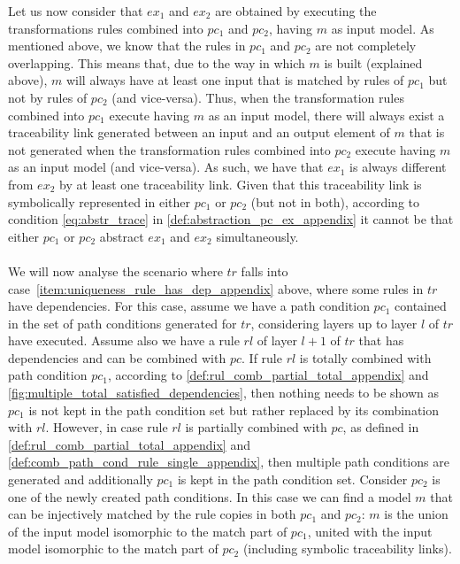 \begin{pf}
Let us now consider that $ex_1$ and $ex_2$ are obtained by executing the transformations rules combined into $pc_1$ and $pc_2$, having $m$ as input model. As mentioned above, we know that the rules in $pc_1$ and $pc_2$ are not completely overlapping. This means that, due to the way in which $m$ is built (explained above), $m$ will always have at least one input that is matched by rules of $pc_1$ but not by rules of $pc_2$ (and vice-versa). Thus, when the transformation rules combined into $pc_1$ execute having $m$ as an input model, there will always exist a traceability link generated between an input and an output element of $m$ that is not generated when the transformation rules combined into $pc_2$ execute having $m$ as an input model (and vice-versa). As such, we have that $ex_1$ is always different from $ex_2$ by at least one traceability link. Given that this traceability link is symbolically represented in either $pc_1$ or $pc_2$ (but not in both), according to condition \cref{eq:abstr_trace} in \cref{def:abstraction_pc_ex_appendix} it cannot be that either $pc_1$ or $pc_2$ abstract $ex_1$ and $ex_2$ simultaneously.\\\\
We will now analyse the scenario where $tr$ falls into case~\ref{item:uniqueness_rule_has_dep_appendix} above, where some rules in $tr$ have dependencies. For this case, assume we have a path condition $pc_1$ contained in the set of path conditions generated for $tr$, considering layers up to layer $l$ of $tr$ have executed. Assume also we have a rule $rl$ of layer $l+1$ of $tr$ that has dependencies and can be combined with $pc$. If rule $rl$ is totally combined with path condition $pc_1$, according to \cref{def:rul_comb_partial_total_appendix} and \cref{fig:multiple_total_satisfied_dependencies}, then nothing needs to be shown as $pc_1$ is not kept in the path condition set but rather replaced by its combination with $rl$. However, in case rule $rl$ is partially combined with $pc$, as defined in \cref{def:rul_comb_partial_total_appendix} and \cref{def:comb_path_cond_rule_single_appendix}, then multiple path conditions are generated and additionally $pc_1$ is kept in the path condition set. Consider $pc_2$ is one of the newly created path conditions. In this case we can find a model $m$ that can be injectively matched by the rule copies in both $pc_1$ and $pc_2$: $m$ is the union of the input model isomorphic to the match part of $pc_1$, united with the input model isomorphic to the match part of $pc_2$ (including symbolic traceability links).\vspace{.3cm}


\end{pf}
